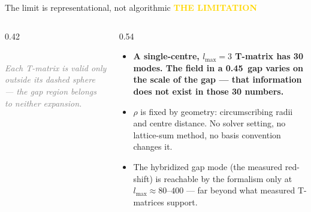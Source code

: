 \documentclass[10pt,aspectratio=169]{beamer}
\newcommand{\kicker}[1]{{\footnotesize\bfseries\textcolor{gold}{#1}}\\[-0.4ex]}
\newcommand{\um}{\,\text{\textmu m}}
\begin{document}
\begin{frame}{The limit is representational, not algorithmic}
  \kicker{THE LIMITATION}
  \begin{columns}[c]
    \begin{column}{0.42\textwidth}
      \begin{center}
      \\[1ex]
      {\scriptsize\textit{\textcolor{gray}{Each T-matrix is valid only outside its dashed sphere ---
      the gap region belongs to neither expansion.}}}
      \end{center}
    \end{column}
    \begin{column}{0.54\textwidth}
      \begin{itemize}\small
        \item \textbf{A single-centre, $l_{\max}=3$ T-matrix has 30 modes. The field in a 0.45\um{} gap varies on the scale of the gap --- that information does not exist in those 30 numbers.}
        \item $\rho$ is fixed by geometry: circumscribing radii and centre distance. No solver setting, no lattice-sum method, no basis convention changes it.
        \item The hybridized gap mode (the measured red-shift) is reachable by the formalism only at $l_{\max}\approx 80$--$400$ --- far beyond what measured T-matrices support.
      \end{itemize}
    \end{column}
  \end{columns}
\end{frame}
\end{document}
